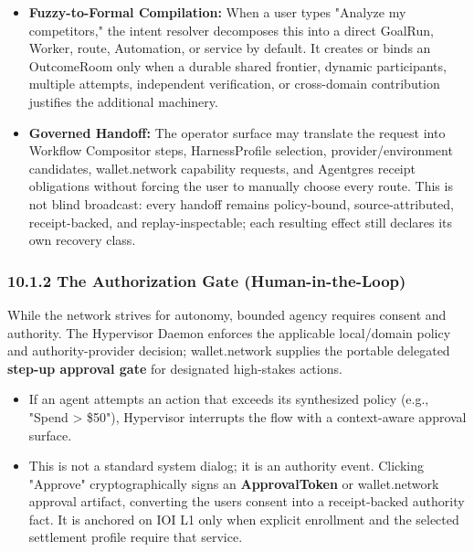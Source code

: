 \documentclass[
  11pt,
]{article}
\providecommand{\tightlist}{%
  \setlength{\itemsep}{0pt}\setlength{\parskip}{0pt}}
\begin{document}
\begin{itemize}
\tightlist
\item
  \textbf{Fuzzy-to-Formal Compilation:} When a user types "Analyze my
  competitors," the intent resolver decomposes this into a direct
  GoalRun, Worker, route, Automation, or service by default. It creates
  or binds an OutcomeRoom only when a durable shared frontier, dynamic
  participants, multiple attempts, independent verification, or
  cross-domain contribution justifies the additional machinery.
\item
  \textbf{Governed Handoff:} The operator surface may translate the
  request into Workflow Compositor steps, HarnessProfile selection,
  provider/environment candidates, wallet.network capability requests,
  and Agentgres receipt obligations without forcing the user to manually
  choose every route. This is not blind broadcast: every handoff remains
  policy-bound, source-attributed, receipt-backed, and replay-inspectable;
  each resulting effect still declares its own recovery class.
\end{itemize}

\hypertarget{the-authorization-gate-human-in-the-loop}{%
\subsubsection{10.1.2 The Authorization Gate
(Human-in-the-Loop)}\label{the-authorization-gate-human-in-the-loop}}

While the network strives for autonomy, bounded agency requires consent
and authority. The Hypervisor Daemon enforces the applicable local/domain
policy and authority-provider decision; wallet.network supplies the portable
delegated \textbf{step-up approval gate} for designated high-stakes actions.

\begin{itemize}
\item
  If an agent attempts an action that exceeds its synthesized policy
  (e.g., "Spend \textgreater{} \$50"), Hypervisor interrupts the flow
  with a context-aware approval surface.
\item
  This is not a standard system dialog; it is an authority event.
  Clicking "Approve" cryptographically signs an
  \textbf{ApprovalToken} or wallet.network approval artifact, converting
  the user\textquotesingle s consent into a receipt-backed authority
  fact. It is anchored on IOI L1 only when explicit enrollment and the
  selected settlement profile require that service.
\end{itemize}
\end{document}
